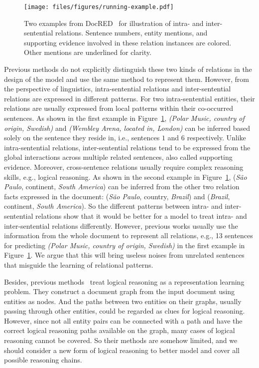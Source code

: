 \documentclass[11pt,a4paper]{article}
\begin{document}
\begin{figure}
    \centering
    \texttt{[image: files/figures/running-example.pdf]}
    \caption{Two examples from DocRED~\citep{DocRED-paper} for illustration of intra- and inter-sentential relations. Sentence numbers, entity mentions, and supporting evidence involved in these relation instances are colored. Other mentions are underlined for clarity.}
    \label{fig:running-example}
\end{figure}
Previous methods do not explicitly distinguish these two kinds of relations in the design of the model and use the same method to represent them. 
However, from the perspective of linguistics, intra-sentential relations and inter-sentential relations are expressed in different patterns. For two intra-sentential entities, their relations are usually expressed from local patterns within their co-occurred sentences. As shown in the first example in Figure~\ref{fig:running-example}, \textit{(Polar Music, country of origin, Swedish)} and \textit{(Wembley Arena, located in, London)} can be inferred based solely on the sentence they reside in, i.e., sentences $1$ and $6$ respectively. Unlike intra-sentential relations, inter-sentential relations tend to be expressed from the global interactions across multiple related sentences, also called supporting evidence. Moreover, cross-sentence relations usually require complex reasoning skills, e.g., logical reasoning. As shown in the second example in Figure~\ref{fig:running-example}, (\textit{São Paulo}, continent, \textit{South America}) can be inferred from the other two relation facts expressed in the document: (\textit{São Paulo}, country, \textit{Brazil}) and (\textit{Brazil}, continent, \textit{South America}). So the different patterns between intra- and inter-sentential relations show that it would be better for a model to treat intra- and inter-sentential relations differently. However, previous works usually use the information from the whole document to represent all relations, e.g., 13 sentences for predicting \textit{(Polar Music, country of origin, Swedish)} in the first example in Figure~\ref{fig:running-example}. We argue that this will bring useless noises from unrelated sentences that misguide the learning of relational patterns. 




Besides, previous methods~\citep{EoG,GAIN} treat logical reasoning as a representation learning problem. They construct a document graph from the input document using entities as nodes. And the paths between two entities on their graphs, usually passing through other entities, could be regarded as clues for logical reasoning. 
However, since not all entity pairs can be connected with a path and have the correct logical reasoning paths available on the graph, many cases of logical reasoning cannot be covered. So their methods are somehow limited, and we should consider a new form of logical reasoning to better model and cover all possible reasoning chains.
\end{document}
